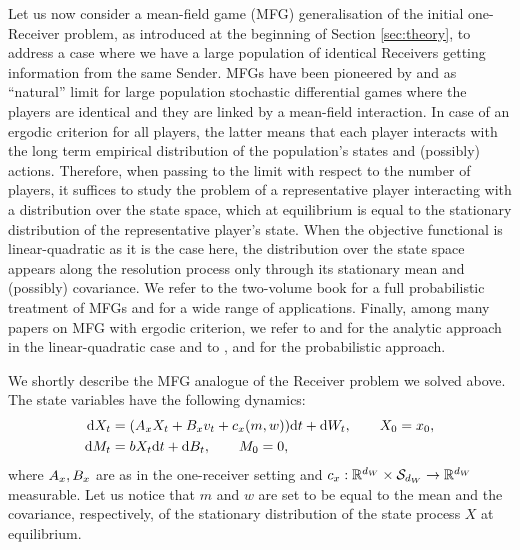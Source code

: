 \documentclass[a4paper,10pt]{article}
\newcommand{\RR}{\mathbb{R}}
\newcommand{\D}{\mathrm{d}}
\theoremstyle{definition}
\theoremstyle{plain}
\numberwithin{equation}{section}
\begin{document}
Let us now consider a mean-field game (MFG) generalisation of the initial one-Receiver problem, as introduced at the beginning of Section \ref{sec:theory}, to address a case where we have a large population of identical Receivers getting information from the same Sender. MFGs have been pioneered by \cite{lasrylions07} and \cite{huang06} as ``natural'' limit for large population stochastic differential games where the players are identical and they are linked by a mean-field interaction. In case of an ergodic criterion for all players, the latter means that each player interacts with the long term empirical distribution of the population's states and (possibly) actions. Therefore, when passing to the limit with respect to the number of players, it suffices to study the problem of a representative player interacting with a distribution over the state space, which at equilibrium is equal to the stationary distribution of the representative player's state. When the objective functional is linear-quadratic as it is the case here, the distribution over the state space appears along the resolution process only through its stationary mean and (possibly) covariance. We refer to the two-volume book \cite{carmona-delarue-book} for a full probabilistic treatment of MFGs and for a wide range of applications. Finally, among many papers on MFG with ergodic criterion, we refer to \cite{bardi13} and \cite{bardi14} for the analytic approach in the linear-quadratic case and to \cite{cohen23}, \cite{cohen24} and \cite{ferrari23} for the probabilistic approach.\smallskip

We shortly describe the MFG analogue of the Receiver problem we solved above. The state variables have the following dynamics:
\begin{align}\label{eq:SDEs-MFG}
\D X_t &= (A_{\rm x} X_t + B_{\rm x} v_t + c_{\rm x}(m,w))\D t +  \D W_t , \qquad X_0= x_0,\\ \nonumber
\D M_t &= b X_t \D t +  \D B_t, \qquad M_0=0,
\end{align}
where $A_{\rm x}, B_{\rm x}$ are as in the one-receiver setting and $c_{\rm x}:\mathbb R^{d_W} \times \mathcal S_{d_W} \to \RR^{d_W}$ measurable.
Let us notice that $m$ and $w$ are set to be equal to the mean and the covariance, respectively, of the stationary distribution of the state process $X$ at equilibrium.
\end{document}
